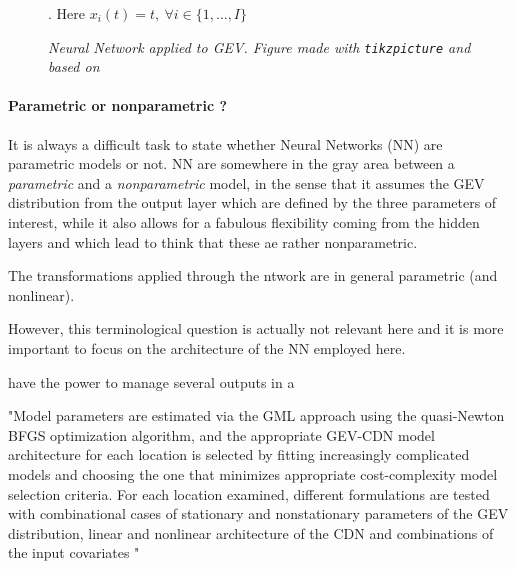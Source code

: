 \begin{figure}[!htb]
\begin{center}
{{
			}
		}
		\vspace{-2.5mm}
		\caption{\emph{ Neural Network applied to GEV. Figure made with \texttt{tikzpicture} and based on  \textcolor{JungleGreen}{\cite{cannon_flexible_2010}}} }. Here $x_i(t)=t,  \ \forall i \in \{1,\ldots,I\}$ 
	\end{center}
\end{figure}

\paragraph*{Parametric or nonparametric ?}
It is always a difficult task to state whether Neural Networks (NN) are parametric models or not. NN  are somewhere in the gray area between a \emph{parametric} and a \emph{nonparametric} model, in the sense that it assumes the GEV distribution from the output layer which are defined by the three parameters of interest, while it also allows for a fabulous flexibility coming from the hidden layers and which lead to think that these ae rather nonparametric. 

The transformations applied through the ntwork are in general parametric (and nonlinear).

However, this terminological question is actually not relevant here and it is more important to focus on the architecture of the NN employed here.

have the power to manage several outputs in a 

"Model parameters are estimated via the GML approach using the
quasi-Newton BFGS optimization algorithm, and the appropriate GEV-CDN model architecture for
each location is selected by fitting increasingly complicated models and choosing the one that
minimizes appropriate cost-complexity model selection criteria. For each location examined, different
formulations are tested with combinational cases of stationary and nonstationary parameters of the
GEV distribution, linear and nonlinear architecture of the CDN and combinations of the input covariates "


